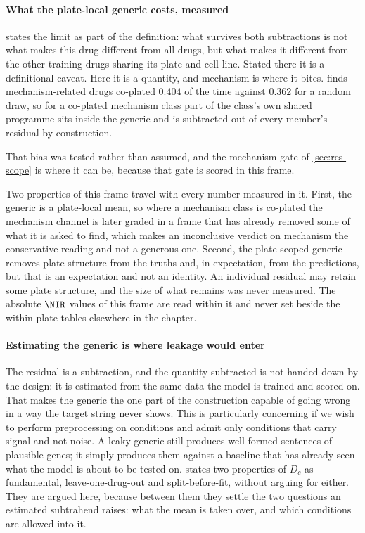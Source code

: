   \paragraph{What the plate-local generic costs, measured}
   states the limit as part of the definition: what
  survives both subtractions is not what makes this drug different from all drugs,
  but what makes it different from the other training drugs sharing its plate and
  cell line. Stated there it is a definitional caveat. Here it is a quantity, and
  mechanism is where it bites.  finds mechanism-related drugs
  co-plated $0.404$ of the time against $0.362$ for a random draw, so for a co-plated
  mechanism class part of the class's own shared programme sits inside the generic
  and is subtracted out of every member's residual by construction.
  
  That bias was tested rather than assumed, and the mechanism gate of
  \cref{sec:res-scope} is where it can be, because that gate is scored in this
  frame.

  \begin{scopelimit}
  Two properties of this frame travel with every number measured in it. First, the
  generic is a plate-local mean, so where a mechanism class is co-plated the
  mechanism channel is later graded in a frame that has already removed some of what
  it is asked to find, which makes an inconclusive verdict on mechanism the
  conservative reading and not a generous one. Second, the plate-scoped generic
  removes plate structure from the truths and, in expectation, from the predictions,
  but that is an expectation and not an identity. An individual residual may retain
  some plate structure, and the size of what remains was never measured. The absolute
  $\NIR$ values of this frame are read within it and never set beside the
  within-plate tables elsewhere in the chapter.
  \end{scopelimit}
  
\paragraph{Estimating the generic is where leakage would enter} The residual is a
subtraction, and the quantity subtracted is not handed down by the design: it is
estimated from the same data the model is trained and scored on. That makes the
generic the one part of the construction capable of going wrong in a way the
target string never shows. This is particularly concerning if we wish to perform preprocessing on conditions and admit only conditions that carry signal and not noise. A leaky generic still produces well-formed sentences of
plausible genes; it simply produces them against a baseline that has already seen
what the model is about to be tested on.  states two
properties of $D_c$ as fundamental, leave-one-drug-out and split-before-fit,
without arguing for either. They are argued here, because between them they settle
the two questions an estimated subtrahend raises: what the mean is taken over, and
which conditions are allowed into it.

